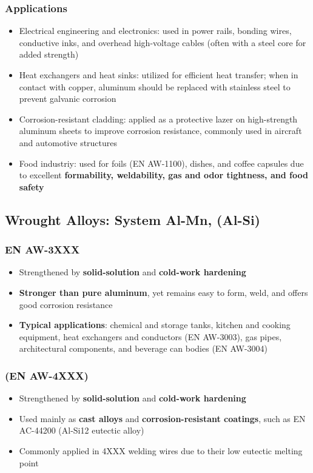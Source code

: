 \documentclass{article}
\begin{document}
\subsubsection{Applications}
\begin{itemize}
  \item Electrical engineering and electronics: used in power rails, bonding wires, conductive inks, and overhead high-voltage cables (often with a steel core for added strength)
  \item Heat exchangers and heat sinks: utilized for efficient heat transfer; when in contact with copper, aluminum should be replaced with stainless steel to prevent galvanic corrosion
  \item Corrosion-resistant cladding: applied as a protective lazer on high-strength aluminum sheets to improve corrosion resistance, commonly used in aircraft and automotive structures
  \item Food industriy: used for foils (EN AW-1100), dishes, and coffee capsules due to excellent \textbf{formability, weldability, gas and odor tightness, and food safety}
\end{itemize}

\subsection{Wrought Alloys: System Al-Mn, (Al-Si)}
\subsubsection{EN AW-3XXX}
\begin{itemize}
  \item Strengthened by \textbf{solid-solution} and \textbf{cold-work hardening}
  \item \textbf{Stronger than pure aluminum}, yet remains easy to form, weld, and offers good corrosion resistance
  \item \textbf{Typical applications}: chemical and storage tanks, kitchen and cooking equipment, heat exchangers and conductors (EN AW-3003), gas pipes, architectural components, and beverage can bodies (EN AW-3004)
\end{itemize}

\subsubsection{(EN AW-4XXX)}
\begin{itemize}
  \item Strengthened by \textbf{solid-solution} and \textbf{cold-work hardening}
  \item Used mainly as \textbf{cast alloys} and \textbf{corrosion-resistant coatings}, such as EN AC-44200 (Al-Si12 eutectic alloy)
  \item Commonly applied in 4XXX welding wires due to their low eutectic melting point
\end{itemize}
\end{document}
